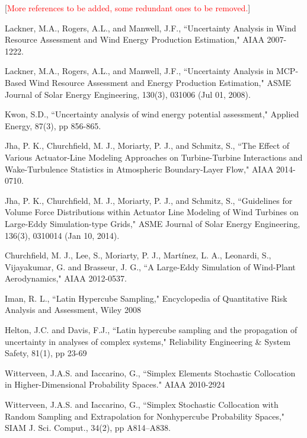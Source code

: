 \documentclass[]{aiaa-tc}%
\begin{document}
\begin{thebibliography}{9}%

[\textcolor{red}{More references to be added, some redundant ones to be removed.}]

Lackner, M.A., Rogers, A.L., and Manwell, J.F., ``Uncertainty Analysis in Wind Resource Assessment and Wind Energy Production Estimation," AIAA 2007-1222.

Lackner, M.A., Rogers, A.L., and Manwell, J.F., ``Uncertainty Analysis in MCP-Based Wind Resource Assessment and Energy Production Estimation," ASME Journal of Solar Energy Engineering, 130(3), 031006 (Jul 01, 2008).

Kwon, S.D., ``Uncertainty analysis of wind energy potential assessment," Applied Energy, 87(3), pp 856-865.

Jha, P. K., Churchfield, M. J., Moriarty, P. J., and Schmitz, S., ``The Effect of Various Actuator-Line   Modeling Approaches on Turbine-Turbine Interactions and Wake-Turbulence Statistics in Atmospheric Boundary-Layer Flow," AIAA 2014-0710.

Jha, P. K., Churchfield, M. J., Moriarty, P. J., and Schmitz, S., ``Guidelines for Volume Force  Distributions within Actuator Line Modeling of Wind Turbines on Large-Eddy Simulation-type Grids," ASME Journal of Solar Energy Engineering, 136(3), 0310014 (Jan 10, 2014).

Churchfield, M. J., Lee, S., Moriarty, P. J., Martínez, L. A., Leonardi, S., Vijayakumar, G. and  Brasseur, J. G., ``A Large-Eddy Simulation of Wind-Plant Aerodynamics," AIAA 2012-0537.

Iman, R. L., ``Latin Hypercube Sampling," Encyclopedia of Quantitative Risk Analysis and Assessment, Wiley 2008

Helton, J.C. and Davis, F.J., ``Latin hypercube sampling and the propagation of uncertainty in analyses of complex systems," Reliability Engineering \& System Safety, 81(1), pp 23-69

Witterveen, J.A.S. and Iaccarino, G., ``Simplex Elements Stochastic Collocation in Higher-Dimensional Probability Spaces." AIAA 2010-2924

Witterveen, J.A.S. and Iaccarino, G., ``Simplex Stochastic Collocation with Random Sampling and Extrapolation for Nonhypercube Probability Spaces," SIAM J. Sci. Comput., 34(2), pp A814–A838.


\end{thebibliography}
\end{document}
